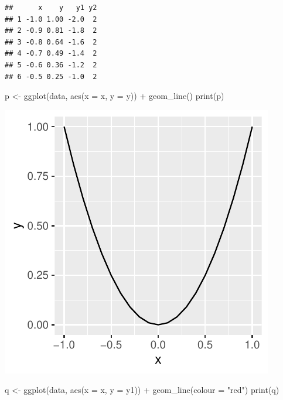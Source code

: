 \documentclass[
]{book}
\newenvironment{Shaded}{\begin{snugshade}}{\end{snugshade}}
\newcommand{\AttributeTok}[1]{\textcolor[rgb]{0.77,0.63,0.00}{#1}}
\newcommand{\FunctionTok}[1]{\textcolor[rgb]{0.00,0.00,0.00}{#1}}
\newcommand{\NormalTok}[1]{#1}
\newcommand{\OtherTok}[1]{\textcolor[rgb]{0.56,0.35,0.01}{#1}}
\newcommand{\SpecialCharTok}[1]{\textcolor[rgb]{0.00,0.00,0.00}{#1}}
\newcommand{\StringTok}[1]{\textcolor[rgb]{0.31,0.60,0.02}{#1}}
\begin{document}
\begin{verbatim}
##      x    y   y1 y2
## 1 -1.0 1.00 -2.0  2
## 2 -0.9 0.81 -1.8  2
## 3 -0.8 0.64 -1.6  2
## 4 -0.7 0.49 -1.4  2
## 5 -0.6 0.36 -1.2  2
## 6 -0.5 0.25 -1.0  2
\end{verbatim}

\begin{Shaded}
\begin{Highlighting}[]
\NormalTok{p }\OtherTok{\textless{}{-}} \FunctionTok{ggplot}\NormalTok{(data, }\FunctionTok{aes}\NormalTok{(}\AttributeTok{x =}\NormalTok{ x, }\AttributeTok{y =}\NormalTok{ y)) }\SpecialCharTok{+}
  \FunctionTok{geom\_line}\NormalTok{()}
\FunctionTok{print}\NormalTok{(p)}
\end{Highlighting}
\end{Shaded}

\includegraphics{bookdown-demo_files/figure-latex/unnamed-chunk-10-1.pdf}

\begin{Shaded}
\begin{Highlighting}[]
\NormalTok{q }\OtherTok{\textless{}{-}} \FunctionTok{ggplot}\NormalTok{(data, }\FunctionTok{aes}\NormalTok{(}\AttributeTok{x =}\NormalTok{ x, }\AttributeTok{y =}\NormalTok{ y1)) }\SpecialCharTok{+}
  \FunctionTok{geom\_line}\NormalTok{(}\AttributeTok{colour =} \StringTok{"red"}\NormalTok{)}
\FunctionTok{print}\NormalTok{(q)}
\end{Highlighting}
\end{Shaded}
\end{document}
